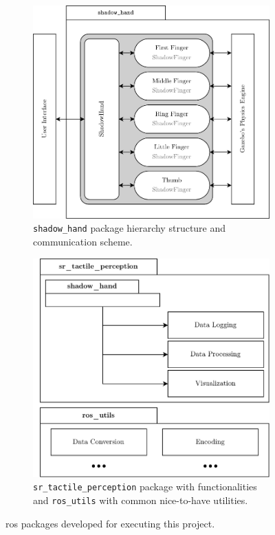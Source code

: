 \begin{figure}[!h]
	\centering
	\begin{subfigure}[b]{0.48\textwidth}
		\centering
		\includegraphics[width=\textwidth]{chapters/system-setup/fig/produced-software-diagram.pdf}
		\caption{\texttt{shadow\_hand} package hierarchy structure and communication scheme.}
		\label{fig:shadow-hand}
	\end{subfigure}
	\hfill
	\begin{subfigure}[b]{0.48\textwidth}
		\centering
		\includegraphics[width=\textwidth]{chapters/system-setup/fig/tactile-perception-package.pdf}
		\caption{\texttt{sr\_tactile\_perception} package with functionalities and \texttt{ros\_utils} with common nice-to-have utilities.}
		\label{fig:tactile-perception-package}
	\end{subfigure}
	\caption{\gls{ros} packages developed for executing this project.}
	\label{fig:shadow-hand-tactile-perception-package}
\end{figure}